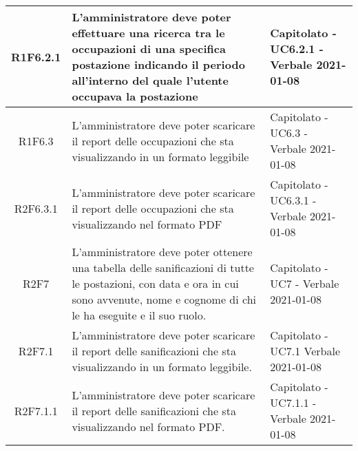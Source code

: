\begin{center}
\begin{longtable}{|c|p{10cm}|p{4cm}|}
			\hline
			R1F6.2.1&L'amministratore deve poter effettuare una ricerca tra le occupazioni di una specifica postazione indicando il periodo all'interno del quale l'utente occupava la postazione	& 	Capitolato - UC6.2.1 - Verbale 2021-01-08\\
			\hline
			R1F6.3 & L'amministratore deve poter scaricare il report delle occupazioni che sta visualizzando in un formato leggibile & Capitolato - UC6.3 - Verbale 2021-01-08\\
			\hline
			R2F6.3.1 & L'amministratore deve poter scaricare il report delle occupazioni che sta visualizzando nel formato PDF & Capitolato - UC6.3.1 - Verbale 2021-01-08\\
			\hline
R2F7&L'amministratore deve poter ottenere una tabella delle sanificazioni di tutte le postazioni, con data e ora in cui sono avvenute, nome e cognome di chi le ha eseguite e il suo ruolo.	&Capitolato - UC7 - Verbale 2021-01-08	\\
					
					\hline
R2F7.1&L'amministratore deve poter scaricare il report delle sanificazioni che sta visualizzando in un formato leggibile.	&Capitolato - UC7.1 Verbale 2021-01-08	\\

\hline
R2F7.1.1&L'amministratore deve poter scaricare il report delle sanificazioni che sta visualizzando nel formato PDF.	&Capitolato - UC7.1.1 - Verbale 2021-01-08	\\


\end{longtable}
\end{center}

